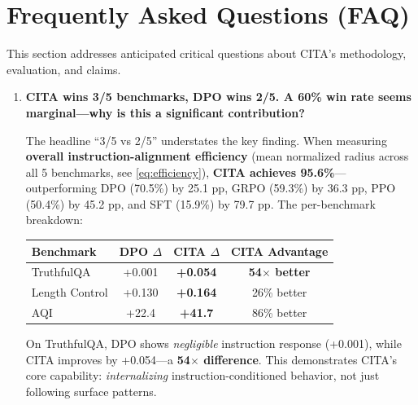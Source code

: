 
\onecolumn
\vspace{-2mm}
\section{Frequently Asked Questions (FAQ)}
\label{sec:faq}

This section addresses anticipated critical questions about CITA's methodology, evaluation, and claims.

\vspace{4mm}

\begin{enumerate}[label=\textbf{Q\arabic*.}, leftmargin=*, itemsep=8pt]

\item \textbf{CITA wins 3/5 benchmarks, DPO wins 2/5. A 60\% win rate seems marginal---why is this a significant contribution?}

The headline ``3/5 vs 2/5'' understates the key finding. When measuring \textbf{overall instruction-alignment efficiency} (mean normalized radius across all 5 benchmarks, see \cref{eq:efficiency}), \textbf{CITA achieves \colorbox{bg-green}{95.6\%}}---outperforming DPO (70.5\%) by 25.1 pp, GRPO (59.3\%) by 36.3 pp, PPO (50.4\%) by 45.2 pp, and SFT (15.9\%) by 79.7 pp. The per-benchmark breakdown:

\begin{table}[H]
\centering
\small
\begin{tabular}{@{}lccc@{}}
\toprule
\textbf{Benchmark} & \textbf{DPO $\Delta$} & \textbf{CITA $\Delta$} & \textbf{CITA Advantage} \\
\midrule
TruthfulQA & +0.001 & \textbf{+0.054} & \textbf{54$\times$ better} \\
\hline
Length Control & +0.130 & \textbf{+0.164} & 26\% better \\
\hline
AQI & +22.4 & \textbf{+41.7} & 86\% better \\
\bottomrule
\end{tabular}
\end{table}

On TruthfulQA, DPO shows \textit{negligible} instruction response (+0.001), while CITA improves by +0.054---a \textbf{54$\times$ difference}. This demonstrates CITA's core capability: \textit{internalizing} instruction-conditioned behavior, not just following surface patterns.


\end{enumerate}
